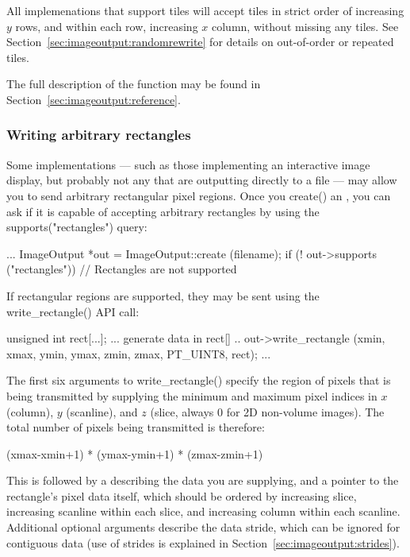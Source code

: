 All \ImageOutput implemenations that support tiles will accept tiles in
strict order of increasing $y$ rows, and within each row, increasing $x$
column, without missing any tiles.  See
Section~\ref{sec:imageoutput:randomrewrite} for details on out-of-order
or repeated tiles.

The full description of the \writetile function may be found
in Section~\ref{sec:imageoutput:reference}.

\subsubsection{Writing arbitrary rectangles}

Some \ImageOutput implementations --- such as those implementing an
interactive image display, but probably not any that are outputting
directly to a file --- may allow you to send arbitrary rectangular pixel
regions.  Once you {\kw create()} an \ImageOutput, you can ask if it is
capable of accepting arbitrary rectangles by using the {\kw
supports("rectangles")} query:

\begin{code}
        ...
        ImageOutput *out = ImageOutput::create (filename);
        if (! out->supports ("rectangles")) {
            // Rectangles are not supported
        }
\end{code}

If rectangular regions are supported, they may be sent using
the {\kw write_rectangle()} API call:

\begin{code}
        unsigned int rect[...];
        ... generate data in rect[] ..
        out->write_rectangle (xmin, xmax, ymin, ymax, zmin, zmax,
                              PT_UINT8, rect);
        ...
\end{code}

The first six arguments to {\kw write_rectangle()} specify the region of
pixels that is being transmitted by supplying the minimum and maximum
pixel indices in $x$ (column), $y$ (scanline), and $z$ (slice, always 0
for 2D non-volume images).  The total number of pixels being transmitted
is therefore:
\begin{code}
        (xmax-xmin+1) * (ymax-ymin+1) * (zmax-zmin+1)
\end{code}
\noindent This is followed by a \ParamBaseType describing the data you
are supplying, and a pointer to the rectangle's pixel data itself, which
should be ordered by increasing slice, increasing scanline within each
slice, and increasing column within each scanline.  Additional optional
arguments describe the data stride, which can be ignored for contiguous
data (use of strides is explained in
Section~\ref{sec:imageoutput:strides}).


